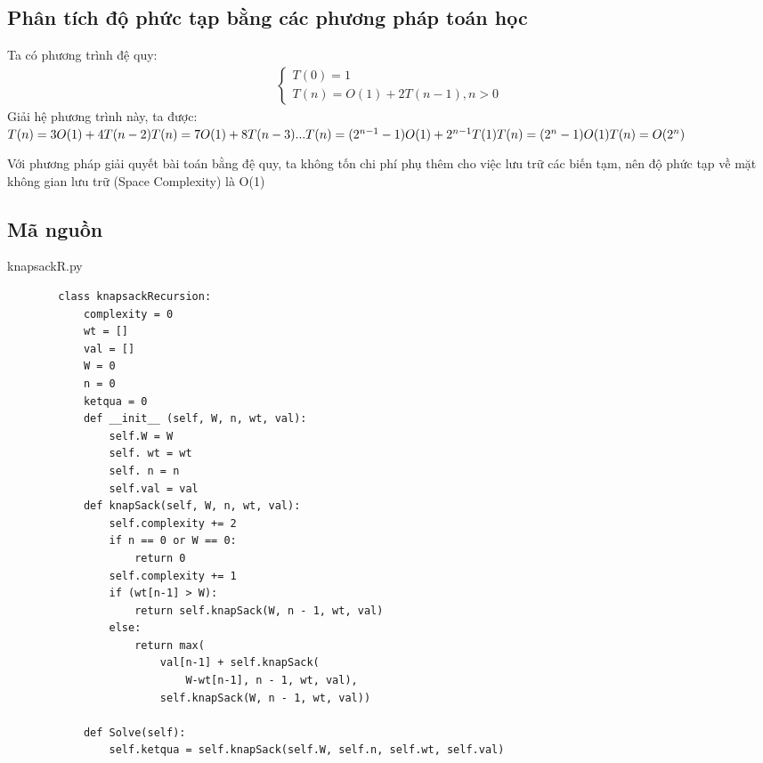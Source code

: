 \documentclass[12pt,a4paper]{report}
\begin{document}
    \subsection{Phân tích độ phức tạp bằng các phương pháp toán học}
    Ta có phương trình đệ quy:
    \begin{align}
        \begin{cases}
            T(0) = 1 \\
            T(n) = O(1) + 2T(n-1), n>0 
        \end{cases}
    \end{align}
    Giải hệ phương trình này, ta được:\\
    \begin{math}
        T(n) = 3O(1) + 4T(n-2) \\
        T(n) = 7O(1) + 8T(n-3) \\ 
        ... \\
        T(n) = (2^{n-1} - 1)O(1) + 2^{n-1}T(1)\\
        T(n) = (2^n-1)O(1)\\
        T(n) = O(2^n)
    \end{math}
    
    
    Với phương pháp giải quyết bài toán bằng đệ quy, ta không tốn chi phí phụ 
    thêm cho việc lưu trữ các biến tạm, nên độ phức tạp về mặt không gian lưu trữ 
    (Space Complexity) là O(1)
    \subsection{Mã nguồn}
    knapsackR.py
    \begin{lstlisting}
        class knapsackRecursion:
            complexity = 0
            wt = []
            val = []
            W = 0
            n = 0
            ketqua = 0
            def __init__ (self, W, n, wt, val):
                self.W = W
                self. wt = wt
                self. n = n
                self.val = val 
            def knapSack(self, W, n, wt, val):
                self.complexity += 2 
                if n == 0 or W == 0:
                    return 0
                self.complexity += 1    
                if (wt[n-1] > W):  
                    return self.knapSack(W, n - 1, wt, val) 
                else: 
                    return max( 
                        val[n-1] + self.knapSack( 
                            W-wt[n-1], n - 1, wt, val), 
                        self.knapSack(W, n - 1, wt, val)) 
            
            def Solve(self):
                self.ketqua = self.knapSack(self.W, self.n, self.wt, self.val)
            
    
    \end{lstlisting}
\end{document}
